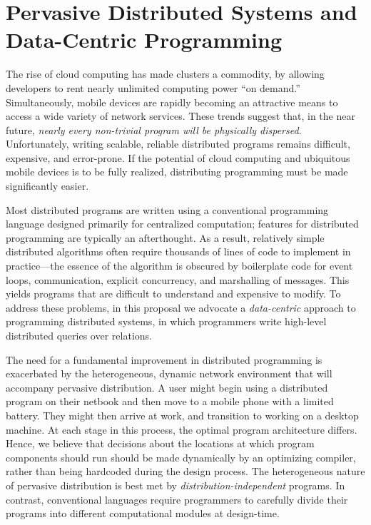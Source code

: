 \section{Pervasive Distributed Systems and Data-Centric Programming}

The rise of cloud computing has made clusters a commodity, by allowing
developers to rent nearly unlimited computing power ``on demand.''
Simultaneously, mobile devices are rapidly becoming an attractive means to
access a wide variety of network services. These trends suggest that, in the
near future, \emph{nearly every non-trivial program will be physically
  dispersed}. Unfortunately, writing scalable, reliable distributed programs
remains difficult, expensive, and error-prone. If the potential of cloud
computing and ubiquitous mobile devices is to be fully realized, distributing
programming must be made significantly easier.

Most distributed programs are written using a conventional programming language
designed primarily for centralized computation; features for distributed
programming are typically an afterthought. As a result, relatively simple
distributed algorithms often require thousands of lines of code to implement in
practice---the essence of the algorithm is obscured by boilerplate code for
event loops, communication, explicit concurrency, and marshalling of
messages. This yields programs that are difficult to understand and expensive to
modify. To address these problems, in this proposal we advocate a
\emph{data-centric} approach to programming distributed systems, in which
programmers write high-level distributed queries over relations.

The need for a fundamental improvement in distributed programming is exacerbated
by the heterogeneous, dynamic network environment that will accompany pervasive
distribution. A user might begin using a distributed program on their netbook
and then move to a mobile phone with a limited battery. They might then arrive
at work, and transition to working on a desktop machine. At each stage in this
process, the optimal program architecture differs. Hence, we believe that
decisions about the locations at which program components should run should be
made dynamically by an optimizing compiler, rather than being hardcoded during
the design process. The heterogeneous nature of pervasive distribution is best
met by \emph{distribution-independent} programs. In contrast, conventional
languages require programmers to carefully divide their programs into different
computational modules at design-time.
